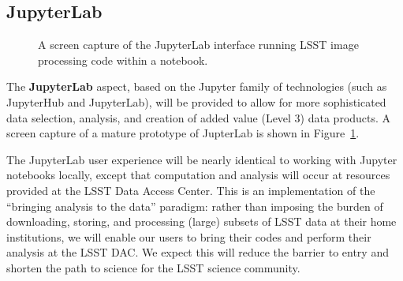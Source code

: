\documentclass[DM,lsstdraft,toc]{lsstdoc}
\begin{document}
\subsection{JupyterLab\label{sec:jupyter}}

\begin{figure}
	\centering
	\caption{A screen capture of the JupyterLab interface running LSST image processing code within a notebook. \label{fig:JupyterLab}}
\end{figure}

The {\bf JupyterLab} aspect, based on the Jupyter family of technologies (such as
JupyterHub and JupyterLab), will be provided to allow for more sophisticated
data selection, analysis, and creation of added value (Level 3) data
products. A screen capture of a mature prototype of JupterLab is shown in 
Figure~\ref{fig:JupyterLab}.

The JupyterLab user experience will be nearly identical to working with
Jupyter notebooks locally, except that computation and analysis will occur
at resources provided at the LSST Data Access Center.  This is an
implementation of the “bringing analysis to the data” paradigm: rather
than imposing the burden of downloading, storing, and processing (large)
subsets of LSST data at their home institutions, we will enable our users to
bring their codes and perform their analysis at the LSST DAC.  We expect
this will reduce the barrier to entry and shorten the path to science for
the LSST science community.
\end{document}
